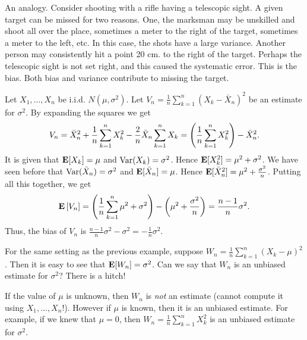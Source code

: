 \documentclass[preprint,  11pt]{amsart}
\def\sig{{\sigma}}
\begin{document}
\berk An analogy. Consider shooting with a rifle having a telescopic sight. A given target can be missed for two reasons. One, the marksman may be unskilled and shoot all over the place, sometimes a meter to the right of the target, sometimes a meter to the left, etc. In this case, the shots have a large variance. Another person may consistently hit a point 20 cm. to the right of the target. Perhaps the telescopic sight is not set right, and this caused the systematic error. This is the bias. Both bias and variance contribute to missing the target.
\eerk


\beg Let $X_{1},\ldots ,X_{n}$ be i.i.d. $N(\mu,\sig^{2})$. Let $V_{n}=\frac{1}{n}\sum_{k=1}^{n}(X_{k}-\bar{X}_{n})^{2}$ be an estimate for $\sig^{2}$. By expanding the squares we get
$$
V_{n}=\bar{X}_{n}^{2}+\frac{1}{n}\sum_{k=1}^{n}X_{k}^{2} -\frac{2}{n}\bar{X}_{n}\sum_{k=1}^{n}X_{k} = \left(\frac{1}{n}\sum_{k=1}^{n}X_{k}^{2} \right)-\bar{X}_{n}^{2}.
$$
It is given that $\mathbf{E}[X_{k}]=\mu$ and $\Var(X_{k})=\sig^{2}$. Hence $\E[X_{k}^{2}]=\mu^{2}+\sig^{2}$. We have seen before that $\Var(\bar{X}_{n})=\sig^{2}$ and $\mathbf{E}[\bar{X}_{n}]=\mu$.  Hence $\E[\bar{X}_{n}^{2}]=\mu^{2}+\frac{\sig^{2}}{n}$. Putting all this together, we get
$$
\E\l[V_{n} \r] = \l( \frac{1}{n}\sum_{k=1}^{n}\mu^{2}+\sig^{2} \r) - \l(\mu^{2}+\frac{\sig^{2}}{n}\r)  = \frac{n-1}{n}\sig^{2}.
$$
Thus, the bias of $V_{n}$ is $\frac{n-1}{n}\sig^{2}-\sig^{2}=-\frac{1}{n}\sig^{2}$.
\eeg

\beg For the same setting as the previous example, suppose $W_{n}=\frac{1}{n}\sum_{k=1}^{n}(X_{k}-\mu)^{2}$. Then it is easy to see that $\E[W_{n}]=\sig^{2}$. Can we say that $W_{n}$ is an unbiased estimate for $\sig^{2}$? There is a hitch!

If the value of $\mu$ is unknown, then $W_{n}$ is {\em not} an estimate (cannot compute it using $X_{1},\ldots ,X_{n}$!). However if $\mu$ is known, then it is an unbiased estimate. For example, if we knew that $\mu=0$, then $W_{n}=\frac{1}{n}\sum_{k=1}^{n}X_{k}^{2}$ is an unbiased estimate for $\sig^{2}$.
\end{document}
